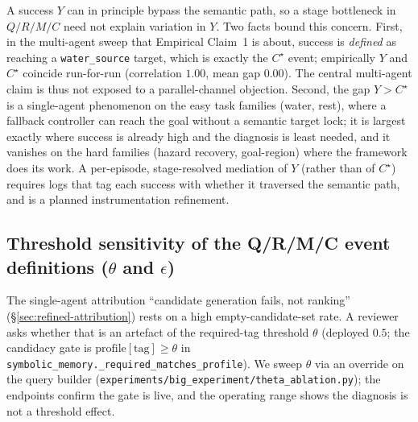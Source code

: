 \documentclass{article}
\newcommand{\method}[1]{\texttt{#1}}
\begin{document}
A success $Y$ can in principle bypass the semantic path, so a stage bottleneck in $Q/R/M/C$ need not explain variation in $Y$. Two facts bound this concern. First, in the multi-agent sweep that Empirical Claim~1 is about, success is \emph{defined} as reaching a \texttt{water\_source} target, which is exactly the $C^\star$ event; empirically $Y$ and $C^\star$ coincide run-for-run (correlation $1.00$, mean gap $0.00$). The central multi-agent claim is thus not exposed to a parallel-channel objection. Second, the gap $Y>C^\star$ is a single-agent phenomenon on the easy task families (water, rest), where a fallback controller can reach the goal without a semantic target lock; it is largest exactly where success is already high and the diagnosis is least needed, and it vanishes on the hard families (hazard recovery, goal-region) where the framework does its work. A per-episode, stage-resolved mediation of $Y$ (rather than of $C^\star$) requires logs that tag each success with whether it traversed the semantic path, and is a planned instrumentation refinement.

\subsection{Threshold sensitivity of the Q/R/M/C event definitions ($\theta$ and $\epsilon$)}
\label{app:theta-robustness}

The single-agent attribution ``candidate generation fails, not ranking''
(\S\ref{sec:refined-attribution}) rests on a high empty-candidate-set rate. A
reviewer asks whether that is an artefact of the required-tag threshold
$\theta$ (deployed $0.5$; the candidacy gate is
$\mathrm{profile}[\text{tag}]\ge\theta$ in
\method{symbolic\_memory.\_required\_matches\_profile}). We sweep $\theta$ via an
override on the query builder (\method{experiments/big\_experiment/theta\_ablation.py});
the endpoints confirm the gate is live, and the operating range shows the
diagnosis is not a threshold effect.
\end{document}
